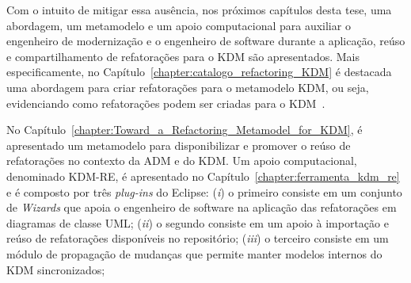 Com o intuito de mitigar essa ausência, nos próximos capítulos desta tese, uma abordagem, um metamodelo e um apoio computacional para auxiliar o engenheiro de modernização e o engenheiro de software durante a aplicação, reúso e compartilhamento de refatorações para o KDM são apresentados. Mais especificamente, no Capítulo~\ref{chapter:catalogo_refactoring_KDM} é destacada uma abordagem para criar refatorações para o metamodelo KDM, ou seja, evidenciando como refatorações podem ser criadas para o KDM~\cite{durelli_catalogo, durelli_VEM_ferramenta}. %

No Capítulo~\ref{chapter:Toward_a_Refactoring_Metamodel_for_KDM}, é apresentado um metamodelo para disponibilizar e promover o reúso de refatorações no contexto da ADM e do KDM. %
Um apoio computacional, denominado KDM-RE, é apresentado no Capítulo~\ref{chapter:ferramenta_kdm_re} e é composto por três \textit{plug-ins} do Eclipse: (\textit{i}) o primeiro consiste em um conjunto de \textit{Wizards} que apoia o engenheiro de software na aplicação das refatorações em diagramas de classe UML; (\textit{ii}) o segundo consiste em um apoio à importação e reúso de refatorações disponíveis no repositório; (\textit{iii}) o terceiro consiste em um módulo de propagação de mudanças que permite manter modelos internos do KDM sincronizados;